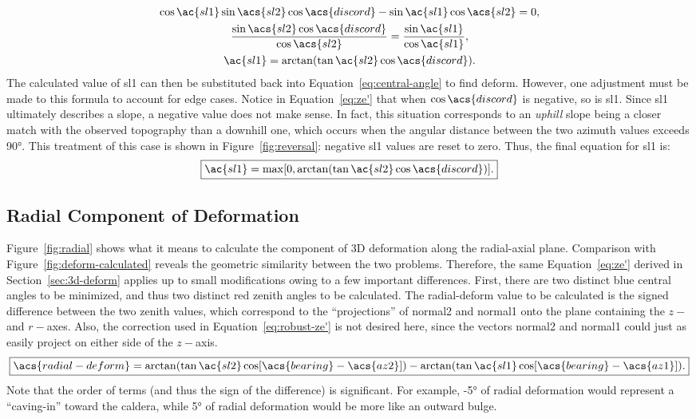 \begin{gather}
    \cos\ac{sl1}\sin\acs{sl2}
    \cos\acs{discord}-\sin\ac{sl1}\cos\acs{sl2}
    =0,\nonumber\\
    \frac{\sin\acs{sl2}
    \cos\acs{discord}}
    {\cos\acs{sl2}}
    =\frac{\sin\ac{sl1}}{\cos\ac{sl1}},\nonumber\\
    \ac{sl1}
    =\arctan(\tan\ac{sl2}
    \cos\acs{discord}).
    \label{eq:ze'}
\end{gather}
The calculated value of \acs{sl1} can then be substituted back into Equation~\eqref{eq:central-angle} to find \acs{deform}. However, one adjustment must be made to this formula to account for edge cases. Notice in Equation~\eqref{eq:ze'} that when $\cos\acs{discord}$ is negative, so is \acs{sl1}. Since \acs{sl1} ultimately describes a slope, a negative value does not make sense. In fact, this situation corresponds to an \emph{uphill} slope being a closer match with the observed topography than a downhill one, which occurs when the angular distance between the two azimuth values exceeds \ang{90}. This treatment of this case is shown in Figure~\ref{fig:reversal}: negative \acs{sl1} values are reset to zero. Thus, the final equation for \acs{sl1} is:
\begin{equation}
    \boxed{\ac{sl1}
    =\max[0,\arctan(\tan\ac{sl2}
    \cos\acs{discord})].}
    \label{eq:robust-ze'}
\end{equation}

\subsection{Radial Component of Deformation}
Figure~\ref{fig:radial} shows what it means to calculate the component of 3D deformation along the radial-axial plane. Comparison with Figure~\ref{fig:deform-calculated} reveals the geometric similarity between the two problems. Therefore, the same Equation~\ref{eq:ze'} derived in Section~\ref{sec:3d-deform} applies up to small modifications owing to a few important differences. First, there are two distinct blue central angles to be minimized, and thus two distinct red zenith angles to be calculated. The \acf{radial-deform} value to be calculated is the signed difference between the two zenith values, which correspond to the ``projections'' of \acs{normal2} and \acs{normal1} onto the plane containing the $z-$ and $r-$axes. Also, the correction used in Equation~\eqref{eq:robust-ze'} is not desired here, since the vectors \acs{normal2} and \acs{normal1} could just as easily project on either side of the $z-$axis.
\begin{equation}
    \boxed{\acs{radial-deform}
    =\arctan(\tan\ac{sl2}
    \cos[\acs{bearing}-\acs{az2}])
    -\arctan(\tan\ac{sl1}
    \cos[\acs{bearing}-\acs{az1}]).}
\end{equation}
Note that the order of terms (and thus the sign of the difference) is significant. For example, \ang{-5} of radial deformation would represent a ``caving-in'' toward the caldera, while \ang{+5} of radial deformation would be more like an outward bulge.


